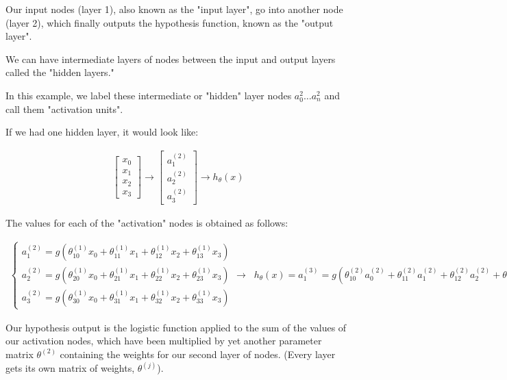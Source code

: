\documentclass{article}
\begin{document}
        Our input nodes (layer 1), also known as the "input layer", go into another node (layer 2), which finally outputs the hypothesis function, known as the "output layer".

        We can have intermediate layers of nodes between the input and output layers called the "hidden layers."

        \newpage
        In this example, we label these intermediate or "hidden" layer nodes $a_0^2 \ldots a_n^2$ and call them "activation units".

        If we had one hidden layer, it would look like:

        \begin{align*}
            \begin{bmatrix}
                x_0 \\
                x_1 \\
                x_2 \\
                x_3
            \end{bmatrix} \longrightarrow
            \begin{bmatrix}
                a_1^{(2)} \\
                a_2^{(2)} \\
                a_3^{(2)} 
            \end{bmatrix} \longrightarrow h_{\theta}(x)
        \end{align*}
        
        The values for each of the "activation" nodes is obtained as follows:

        \begin{align*}
            \begin{cases}
                a_1^{(2)} = g(\theta_{10}^{(1)}x_0 + \theta_{11}^{(1)}x_1 + \theta_{12}^{(1)}x_2 + \theta_{13}^{(1)}x_3) \\
                a_2^{(2)} = g(\theta_{20}^{(1)}x_0 + \theta_{21}^{(1)}x_1 + \theta_{22}^{(1)}x_2 + \theta_{23}^{(1)}x_3) \\
                a_3^{(2)} = g(\theta_{30}^{(1)}x_0 + \theta_{31}^{(1)}x_1 + \theta_{32}^{(1)}x_2 + \theta_{33}^{(1)}x_3)
            \end{cases} \longrightarrow \; \;h_{\theta}(x) = a_1^{(3)} = g(\theta_{10}^{(2)}a_0^{(2)} + \theta_{11}^{(2)}a_1^{(2)}+ \theta_{12}^{(2)}a_2^{(2)} + \theta_{13}^{(2)}a_3^{(2)})
        \end{align*}

        Our hypothesis output is the logistic function applied to the sum of the values of our activation nodes, 
        which have been multiplied by yet another parameter matrix $\theta^{(2)}$ containing the weights for our second layer of nodes.
        (Every layer gets its own matrix of weights, $\theta^{(j)}$).
\end{document}

